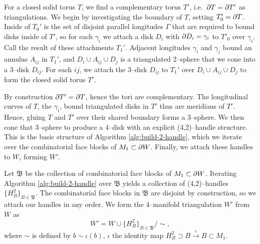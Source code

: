 For a closed solid torus $T$, we find a complementary torus $T'$, i.e.\ $\partial T=\partial T'$ as triangulations.
We begin by investigating the boundary of $T$, setting $T_0'=\partial T$.
Inside of $T_0'$ is the set of disjoint parallel longitudes $\Gamma$ that are required to bound disks inside of $T'$, so for each $\gamma_i$ we attach a disk $D_i$ with $\partial D_i=\gamma_i$ to $T'_0$ over $\gamma_i$.
Call the result of these attachments $T_1'$.
Adjacent longitudes $\gamma_i$ and $\gamma_j$ bound an annulus $A_{ij}$ in $T_1'$, and $D_i \cup A_{ij}\cup D_j$ is a triangulated 2--sphere that we cone into a 3--disk $D_{ij}$.
For each $ij$, we attach the 3--disk $D_{ij}$ to $T_1'$ over $D_i\cup A_{ij}\cup D_j$ to form the closed solid torus $T'$.

By construction $\partial T'=\partial T$, hence the tori are complementary.
The longitudinal curves of $T$, the $\gamma_i$, bound triangulated disks in $T'$ thus
are meridians of $T'$.
Hence, gluing $T$ and $T'$ over their shared boundary forms a 3--sphere.
We then cone that 3--sphere to produce a 4--disk with an explicit (4,2)--handle structure.
This is the basic structure of Algorithm \ref{alg:build-2-handle}, which we iterate over the combinatorial face blocks of $M_1\subset \partial W$.
Finally, we attach these handles to $W$, forming $W'$.

Let $\mathfrak{B}$ be the collection of combinatorial face blocks of $M_1\subset \partial W$.
Iterating Algorithm \ref{alg:build-2-handle} over $\mathfrak{B}$ yields a collection of (4,2)--handles $\{H_B^2\}_{B\in\mathfrak{B}}$.
The combinatorial face blocks in $\mathfrak{B}$ are disjoint by construction, so we attach our handles in any order.
We form the 4--manifold triangulation $W'$ from $W$ as
\[
	W' = W\cup\{H_B^2\}_{B\in\mathfrak{B}}/\sim,
\]
where $\sim$ is defined by $b\sim \iota(b)$, $\iota$ the identity map $H_B^2\supset B\overset{\iota}{\to} B\subset M_1$.



